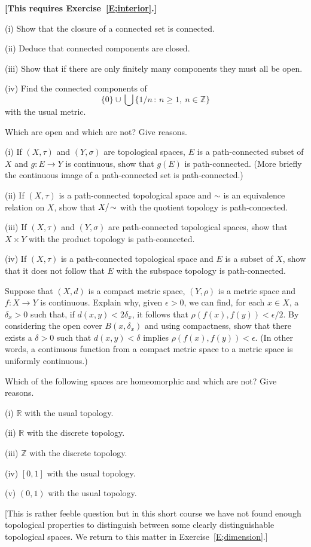 \begin{problem} {\bf [This requires Exercise~\ref{E;interior}.]}

(i) Show that the closure of a connected set is connected.

(ii) Deduce that connected components are closed.

(iii) Show that if there are only finitely many
components they must all be open.

(iv) Find the connected components of
\[\{0\}\cup\bigcup\{1/n\,:\,n\geq 1,\ n\in{\mathbb Z}\}\]
with the usual metric.

Which are open and which are not? Give reasons.
\end{problem}
\begin{problem}\label{E;quotient path-connected}
(i) If $(X,\tau)$ and $(Y,\sigma)$ are topological spaces,
$E$ is a path-connected subset of $X$ and $g:E\rightarrow Y$
is continuous, show that $g(E)$ is path-connected.
(More briefly the continuous image of a path-connected
set is path-connected.)

(ii) If $(X,\tau)$ is a path-connected topological space
and $\sim$ is an equivalence relation on $X$,
show that $X/\negthinspace\sim$
with the quotient topology is path-connected.

(iii) If $(X,\tau)$ and $(Y,\sigma)$ are
path-connected topological spaces, show that $X\times Y$
with the product topology is path-connected.

(iv) If $(X,\tau)$ is a
path-connected topological space and $E$ is a subset of $X$,
show that it does not follow that $E$ with the subspace
topology is path-connected.
\end{problem}
\begin{problem}\label{E;uniform continuity}
Suppose that $(X,d)$ is a compact metric space,
$(Y,\rho)$ is a metric space and $f:X\rightarrow Y$
is continuous. Explain why, given $\epsilon>0$,
we can find, for each $x\in X$, a $\delta_{x}>0$
such that, if $d(x,y)<2\delta_{x}$, it follows that
$\rho(f(x),f(y))<\epsilon/2$. By considering
the open cover $B(x,\delta_{x})$ and using compactness,
show that there exists a $\delta>0$ such that
$d(x,y)<\delta$ implies $\rho(f(x),f(y))<\epsilon$.
(In other words, a continuous function from a
compact metric space to a metric space is uniformly continuous.)
\end{problem}
\begin{problem}\label{E;homeomorphic, non-homeomorphic}
Which of the following spaces are
homeomorphic and which are not? Give reasons.

(i) ${\mathbb R}$ with the usual topology.

(ii) ${\mathbb R}$ with the discrete topology.

(iii) ${\mathbb Z}$ with the discrete topology.

(iv) $[0,1]$ with the usual topology.

(v) $(0,1)$ with the usual topology.

[This is rather feeble question but in this short
course we have not found enough topological properties
to distinguish between some clearly distinguishable
topological spaces. We return to this matter
in Exercise~\ref{E;dimension}.]
\end{problem}
